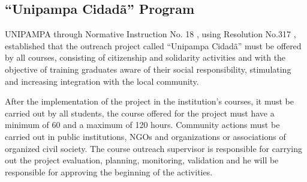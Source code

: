 \subsection{``Unipampa Cidadã'' Program}\label{sec:3.2.2}


\ac{UNIPAMPA} through Normative Instruction No. 18 \cite{unipampacidada}, using Resolution No.317 \cite{res317}, established that the outreach project called ``Unipampa Cidadã'' must be offered by all courses, consisting of citizenship and solidarity activities and with the objective of training graduates aware of their social responsibility, stimulating and increasing integration with the local community.


After the implementation of the project in the institution's courses, it must be carried out by all students, the course offered for the project must have a minimum of 60 and a maximum of 120 hours.
Community actions must be carried out in public institutions, \acp{NGO} and organizations or associations of organized civil society. 
The course outreach supervisor is responsible for carrying out the project evaluation, planning, monitoring, validation and he will be responsible for approving the beginning of the activities.

